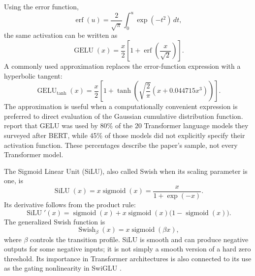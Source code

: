 Using the error function,
\begin{equation}
    \operatorname{erf}(u)
    =
    \frac{2}{\sqrt{\pi}}\int_0^u\exp(-t^2)\,dt,
    \label{eq:act-erf}
\end{equation}
the same activation can be written as
\begin{equation}
    \operatorname{GELU}(x)
    =
    \frac{x}{2}
    \left[
        1+\operatorname{erf}\left(\frac{x}{\sqrt{2}}\right)
    \right].
    \label{eq:act-gelu-erf}
\end{equation}
A commonly used approximation replaces the error-function expression with
a hyperbolic tangent:
\begin{equation}
    \operatorname{GELU}_{\tanh}(x)
    =
    \frac{x}{2}
    \left[
        1+
        \tanh\left(
            \sqrt{\frac{2}{\pi}}
            \left(x+0.044715x^3\right)
        \right)
    \right].
    \label{eq:act-gelu-approx}
\end{equation}
The approximation is useful when a computationally convenient expression
is preferred to direct evaluation of the Gaussian cumulative distribution
function. \textcite{fang2023raft} report that GELU was used by 80\% of the
20 Transformer language models they surveyed after BERT, while 45\% of
those models did not explicitly specify their activation function. These
percentages describe the paper's sample, not every Transformer model.

The Sigmoid Linear Unit (SiLU), also called Swish when its scaling
parameter is one, is
\begin{equation}
    \operatorname{SiLU}(x)
    =
    x\operatorname{sigmoid}(x)
    =
    \frac{x}{1+\exp(-x)}.
    \label{eq:act-silu}
\end{equation}
Its derivative follows from the product rule:
\begin{equation}
    \operatorname{SiLU}'(x)
    =
    \operatorname{sigmoid}(x)
    +
    x\operatorname{sigmoid}(x)
    \bigl(1-\operatorname{sigmoid}(x)\bigr).
    \label{eq:act-silu-derivative}
\end{equation}
The generalized Swish function is
\begin{equation}
    \operatorname{Swish}_{\beta}(x)
    =
    x\operatorname{sigmoid}(\beta x),
    \label{eq:act-swish-beta}
\end{equation}
where \(\beta\) controls the transition profile. SiLU is smooth and can
produce negative outputs for some negative inputs; it is not simply a
smooth version of a hard zero threshold. Its importance in Transformer
architectures is also connected to its use as the gating nonlinearity in
SwiGLU \parencite{zhuo2025polycom,lukac2026llms}.

